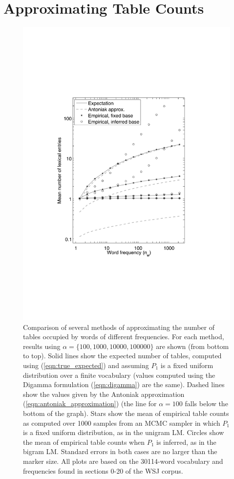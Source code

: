 \documentclass[11pt]{article}
\begin{document}
\section{Approximating Table Counts}
\begin{figure}[t]
\begin{center}
\includegraphics[scale=0.5]{approximations.pdf}
\end{center}
\caption[]{Comparison of several methods of approximating the number of tables occupied by words of different frequencies. 
For each method, results using $\alpha = \{100, 1000, 10000, 100000\}$ are shown (from bottom to top).  
Solid lines show the expected number of tables, computed using (\ref{eqn:true_expected}) and assuming $P_1$ is a fixed uniform distribution over a finite vocabulary (values computed using the Digamma formulation (\ref{eqn:digamma}) are the same).    
Dashed lines show the values given by the Antoniak approximation (\ref{eqn:antoniak_approximation}) (the line for $\alpha = 100$ falls below the bottom of the graph).  
Stars show the mean of empirical table counts as computed over 1000 samples from an MCMC sampler in which $P_1$ is a fixed uniform distribution, as in the unigram LM.  
Circles show the mean of empirical table counts when $P_1$ is inferred, as in the bigram LM.  Standard errors in both cases are no larger than the marker size.  
All plots are based on the 30114-word vocabulary and frequencies found in sections 0-20 of the WSJ corpus.}
\label{fig:graphs}
\end{figure}
\end{document}

